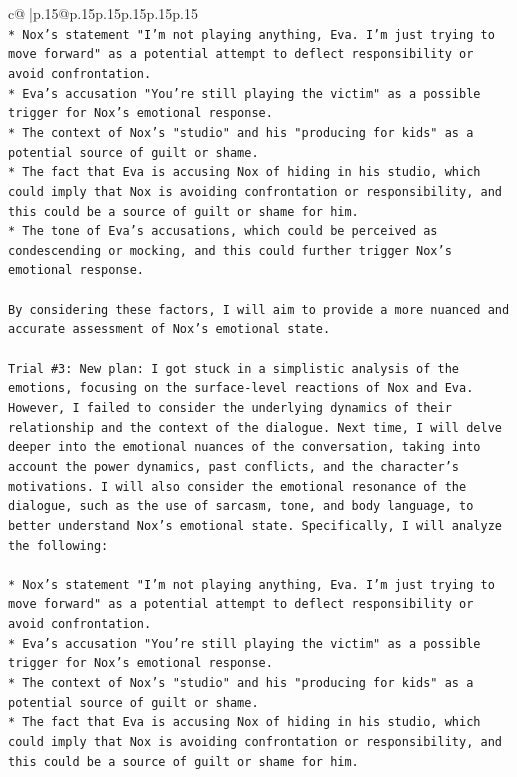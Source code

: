 \documentclass{article}
\begin{document}
{\begin{supertabular}{c@{$\;$}|p{.15\linewidth}@{}p{.15\linewidth}p{.15\linewidth}p{.15\linewidth}p{.15\linewidth}p{.15\linewidth}}
{{{\\ 
\texttt{* Nox's statement "I'm not playing anything, Eva. I'm just trying to move forward" as a potential attempt to deflect responsibility or avoid confrontation.} \\
\texttt{* Eva's accusation "You're still playing the victim" as a possible trigger for Nox's emotional response.} \\
\texttt{* The context of Nox's "studio" and his "producing for kids" as a potential source of guilt or shame.} \\
\texttt{* The fact that Eva is accusing Nox of hiding in his studio, which could imply that Nox is avoiding confrontation or responsibility, and this could be a source of guilt or shame for him.} \\
\texttt{* The tone of Eva's accusations, which could be perceived as condescending or mocking, and this could further trigger Nox's emotional response.} \\
\\ 
\texttt{By considering these factors, I will aim to provide a more nuanced and accurate assessment of Nox's emotional state.} \\
\\ 
\texttt{Trial \#3: New plan: I got stuck in a simplistic analysis of the emotions, focusing on the surface{-}level reactions of Nox and Eva. However, I failed to consider the underlying dynamics of their relationship and the context of the dialogue. Next time, I will delve deeper into the emotional nuances of the conversation, taking into account the power dynamics, past conflicts, and the character's motivations. I will also consider the emotional resonance of the dialogue, such as the use of sarcasm, tone, and body language, to better understand Nox's emotional state. Specifically, I will analyze the following:} \\
\\ 
\texttt{* Nox's statement "I'm not playing anything, Eva. I'm just trying to move forward" as a potential attempt to deflect responsibility or avoid confrontation.} \\
\texttt{* Eva's accusation "You're still playing the victim" as a possible trigger for Nox's emotional response.} \\
\texttt{* The context of Nox's "studio" and his "producing for kids" as a potential source of guilt or shame.} \\
\texttt{* The fact that Eva is accusing Nox of hiding in his studio, which could imply that Nox is avoiding confrontation or responsibility, and this could be a source of guilt or shame for him.} \\
}}}
\end{supertabular}}
\end{document}
